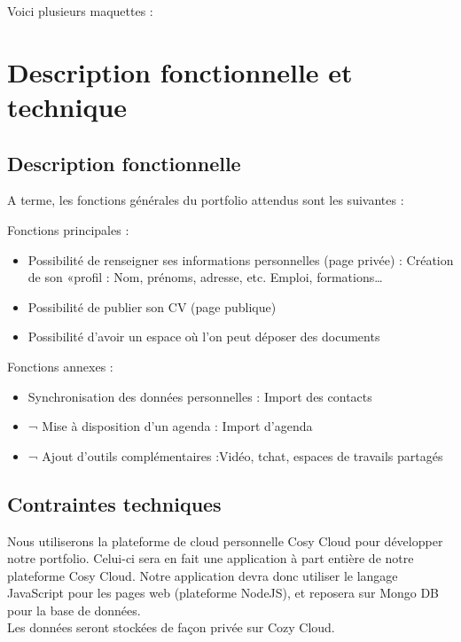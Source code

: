 Voici plusieurs maquettes :

\section{Description fonctionnelle et technique}

\subsection{Description fonctionnelle}

A terme, les fonctions générales du portfolio attendus sont les suivantes :

Fonctions principales : \\

\begin{itemize}
    \item Possibilité de renseigner ses informations personnelles (page privée) : Création de son «profil : Nom, prénoms, adresse, etc. Emploi, formations…
    \item Possibilité de publier son CV (page publique)
    
    \item Possibilité d’avoir un espace où l’on peut déposer des documents

\end{itemize}

Fonctions annexes : \\

\begin{itemize}
    \item Synchronisation des données personnelles : Import des contacts
    \item ¬	Mise à disposition d’un agenda : Import d’agenda
    \item ¬	Ajout d’outils complémentaires :Vidéo, tchat, espaces de travails partagés


\end{itemize}

\subsection{Contraintes techniques}

Nous utiliserons la plateforme de cloud personnelle Cosy Cloud pour développer notre portfolio. Celui-ci sera en fait une application à part entière de notre plateforme Cosy Cloud. Notre application devra donc utiliser le langage JavaScript pour les pages web (plateforme NodeJS), et reposera sur Mongo DB pour la base de données. \\
Les données seront stockées de façon privée sur Cozy Cloud. 


